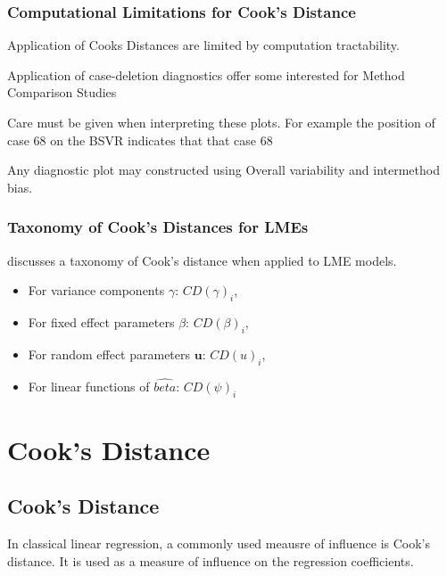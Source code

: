 \documentclass[12pt, a4paper]{article}
\begin{document}
\subsubsection{Computational Limitations for Cook's Distance}
Application of Cooks Distances are limited by computation tractability.


Application of case-deletion diagnostics offer some interested for Method Comparison Studies


Care must be given when interpreting these plots. For example the position of case 68 on the BSVR indicates that that
case 68



Any diagnostic plot may constructed using Overall variability and intermethod bias.



	\subsubsection{Taxonomy of Cook's Distances for LMEs}
	\citet{Zewotir} discusses a taxonomy of Cook's distance when applied to LME models. 
	\begin{itemize}
		\item For variance components $\gamma$: $CD(\gamma)_i$,
		\item For fixed effect parameters $\beta$: $CD(\beta)_i$,
		\item For random effect parameters $\boldsymbol{u}$: $CD(u)_i$,
		\item For linear functions of $\hat{beta}$: $CD(\psi)_i$
	\end{itemize}			
	
	
	
	

\section{Cook's Distance} %




\subsection{Cook's Distance}
In classical linear regression, a commonly used meausre of influence is Cook's distance. It is used as a measure of influence on the regression coefficients.
\end{document}
